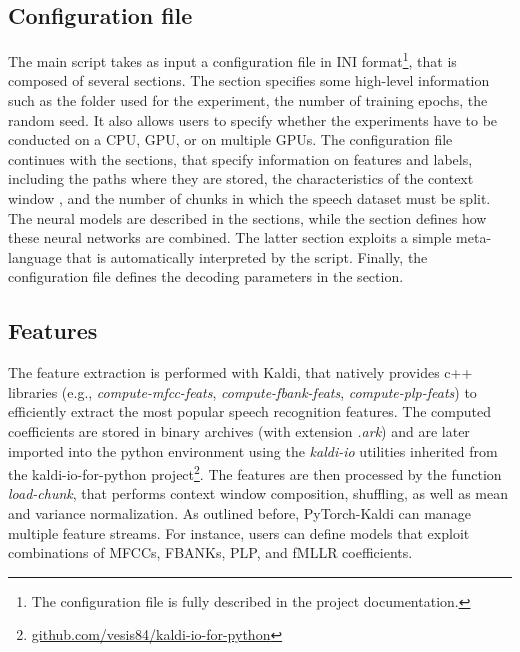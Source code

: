 \documentclass{article}
\begin{document}
\subsection{Configuration file}
The main script takes as input a configuration file in INI format\footnote{The configuration file is fully described in the project documentation.}, that is composed of several sections.
The section  specifies some high-level information such as the folder used for the experiment, the number of training epochs, the random seed. It also allows users to specify whether the experiments have to be conducted on a CPU, GPU, or on multiple GPUs.
The configuration file continues with the  sections, that specify information on features and labels, including the paths where they are stored, the characteristics of the context window \cite{acw_sc}, and the number of chunks in which the speech dataset must be split. The neural models are described in the  sections, while the  section defines how these neural networks are combined. The latter section exploits a simple meta-language that is automatically interpreted by the  script.
Finally, the configuration file defines the decoding parameters in the  section.


\subsection{Features}
The feature extraction is performed with Kaldi, that natively provides c++ libraries (e.g., \textit{compute-mfcc-feats}, \textit{compute-fbank-feats}, \textit{compute-plp-feats}) to efficiently extract the most popular speech recognition features.  
The computed coefficients are stored in binary archives (with extension \textit{.ark}) and are later imported into the python environment using the \textit{kaldi-io} utilities inherited from the kaldi-io-for-python project\footnote{\url{github.com/vesis84/kaldi-io-for-python}}. The features are then processed by the function \textit{load-chunk},  that performs context window composition, shuffling, as well as mean and variance normalization. As outlined before,  PyTorch-Kaldi can manage multiple feature streams. For instance, users can define models that exploit combinations of MFCCs, FBANKs, PLP, and fMLLR \cite{mllr} coefficients.
\end{document}
